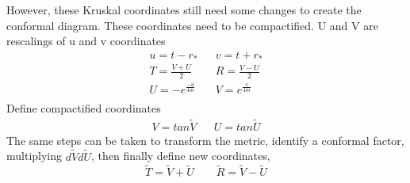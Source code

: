 \documentclass[10pt]{article}
\begin{document}
              \newpage
              However, these Kruskal coordinates still need some changes to create the conformal diagram. These coordinates need to be compactified. 
              U and V are rescalings of u and v coordinates
              \begin{equation}
                 \begin{align}
                 u=t-r_* && v=t+r_* \\
                 T=\frac{V+U}{2}&&  R=\frac{V-U}{2}\\
                 U=-e^{\frac{-u}{4m}}&&V=e^{\frac{v}{4m}}\\
             \end{align}
              \end{equation}
              Define compactified coordinates
              \begin{equation}
              \begin{align}
                 V=tan\widetilde{V} && U=tan\widetilde{U}
                 \end{align}
              \end{equation}
              The same steps can be taken to transform the metric, identify a conformal factor, multiplying $d\widetilde{V}d\widetilde{U}$, then finally define new coordinates, 
              \begin{equation}
                  \widetilde{T}=\widetilde{V}+\widetilde{U}\qquad \widetilde{R}=\widetilde{V}-\widetilde{U}
              \end{equation}
              
\end{document}
